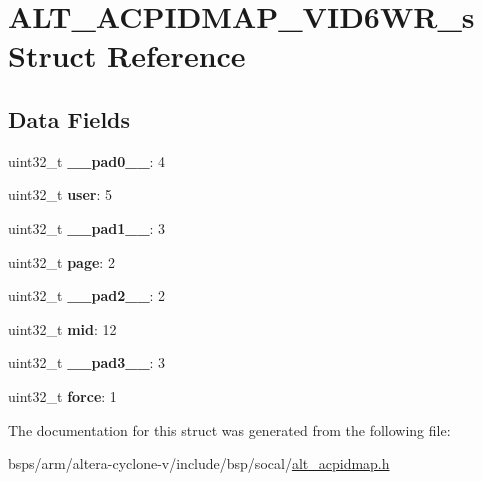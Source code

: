 \hypertarget{structALT__ACPIDMAP__VID6WR__s}{}\section{A\+L\+T\+\_\+\+A\+C\+P\+I\+D\+M\+A\+P\+\_\+\+V\+I\+D6\+W\+R\+\_\+s Struct Reference}
\label{structALT__ACPIDMAP__VID6WR__s}
\subsection*{Data Fields}
\begin{DoxyCompactItemize}
\item 
\mbox{\label{structALT__ACPIDMAP__VID6WR__s_aa502305be81e36eefe3a15e6210b1947}} 
uint32\+\_\+t {\bfseries \+\_\+\+\_\+pad0\+\_\+\+\_\+}\+: 4
\item 
\mbox{\label{structALT__ACPIDMAP__VID6WR__s_a057d462278c3662462bcca4aec7f3258}} 
uint32\+\_\+t {\bfseries user}\+: 5
\item 
\mbox{\label{structALT__ACPIDMAP__VID6WR__s_a6ab10076e2f5c7c233eaa212c1740f7b}} 
uint32\+\_\+t {\bfseries \+\_\+\+\_\+pad1\+\_\+\+\_\+}\+: 3
\item 
\mbox{\label{structALT__ACPIDMAP__VID6WR__s_a82e5233efd51bdfd1baa6d4b72d97508}} 
uint32\+\_\+t {\bfseries page}\+: 2
\item 
\mbox{\label{structALT__ACPIDMAP__VID6WR__s_ad2a29378bfd87963e0a4f9effb597373}} 
uint32\+\_\+t {\bfseries \+\_\+\+\_\+pad2\+\_\+\+\_\+}\+: 2
\item 
\mbox{\label{structALT__ACPIDMAP__VID6WR__s_aaa073fcbe2770a3d16c5e19ef39a06bc}} 
uint32\+\_\+t {\bfseries mid}\+: 12
\item 
\mbox{\label{structALT__ACPIDMAP__VID6WR__s_a8229150ef66aa73b7fac6d7eabbda586}} 
uint32\+\_\+t {\bfseries \+\_\+\+\_\+pad3\+\_\+\+\_\+}\+: 3
\item 
\mbox{\label{structALT__ACPIDMAP__VID6WR__s_afefc3fb1a127b8545966980ab270e2b6}} 
uint32\+\_\+t {\bfseries force}\+: 1
\end{DoxyCompactItemize}


The documentation for this struct was generated from the following file\+:\begin{DoxyCompactItemize}
\item 
bsps/arm/altera-\/cyclone-\/v/include/bsp/socal/\mbox{\hyperlink{alt__acpidmap_8h}{alt\+\_\+acpidmap.\+h}}\end{DoxyCompactItemize}

